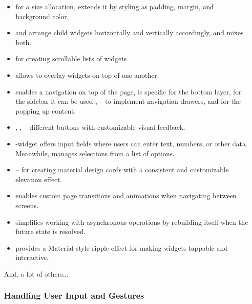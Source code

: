 \begin{itemize}
  \item {} for a size allocation,  extends it by styling as padding, margin, and background color.

  \item {} and  arrange child widgets horizontally and vertically accordingly, and   
  mixes both.

  \item {} for creating scrollable lists of widgets

  \item {} allows to overlay widgets on top of one another.

  \item {} enables a navigation on top of the page,  is specific for the bottom 
  layer, for the sidebar it can be used ,  -- to implement navigation drawers, and 
   for the popping up content.

  \item {}, ,  -- different buttons with customizable visual feedback.

  \item {}-widget offers input fields where users can enter text, numbers, or other data. Meanwhile,
   manages selections from a list of options.
  
  \item {} -- for creating material design cards with a consistent and customizable elevation effect.

  \item {} enables custom page transitions and animations when navigating between screens.

  \item {} simplifies working with asynchronous operations by rebuilding itself when the future state is 
  resolved.

  \item {} provides a Material-style ripple effect for making widgets tappable and interactive.
\end{itemize}

\noindent And, a lot of others...


\subsubsection{Handling User Input and Gestures}

